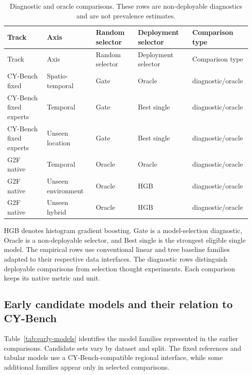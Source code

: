 \documentclass[runningheads]{venue/lncs/llncs}
\begin{document}
{\scriptsize
\begin{longtable}{p{2.25cm}p{1.8cm}p{1.65cm}p{1.65cm}p{2.4cm}}
\caption{Diagnostic and oracle comparisons. These rows are non-deployable diagnostics and are not prevalence estimates.}\label{tab:early-diagnostic}\\
\toprule
Track & Axis & Random selector & Deployment selector & Comparison type\\
\midrule
\endfirsthead
\toprule
Track & Axis & Random selector & Deployment selector & Comparison type\\
\midrule
\endhead
CY-Bench fixed & Spatio-temporal & Gate & Oracle & diagnostic/oracle\\
CY-Bench fixed experts & Temporal & Gate & Best single & diagnostic/oracle\\
CY-Bench fixed experts & Unseen location & Gate & Best single & diagnostic/oracle\\
G2F native & Temporal & Oracle & Oracle & diagnostic/oracle\\
G2F native & Unseen environment & Oracle & HGB & diagnostic/oracle\\
G2F native & Unseen hybrid & Oracle & HGB & diagnostic/oracle\\
\bottomrule
\end{longtable}
}

HGB denotes histogram gradient boosting. Gate is a model-selection diagnostic, Oracle is a non-deployable selector, and Best single is the strongest eligible single model. The empirical rows use conventional linear and tree baseline families adapted to their respective data interfaces. The diagnostic rows distinguish deployable comparisons from selection thought experiments. Each comparison keeps its native metric and unit.

\subsection{Early candidate models and their relation to CY-Bench}

Table~\ref{tab:early-models} identifies the model families represented in the earlier comparisons. Candidate sets vary by dataset and split. The fixed references and tabular models use a CY-Bench-compatible regional interface, while some additional families appear only in selected comparisons.
\end{document}
